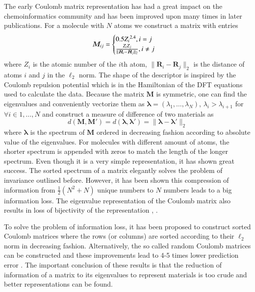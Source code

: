 \documentclass[11pt,oneside,czech,american]{book} %
\theoremstyle{plain}
\theoremstyle{definition}
\begin{document}
The early Coulomb matrix representation \parencite{rupp12} has had a great impact on the chemoinformatics community and has been improved upon many times in later publications. For a molecule with $N$ atoms we construct a matrix with entries
\begin{equation}
	\bm{M}_{ij} =
	\begin{cases}
		0.5 {Z_{i}}^{2.4},\space i = j \\
		\frac{Z_i Z_j}{\|\boldsymbol{R}_i - \boldsymbol{R}_j\|_2}, \space i \neq j \\
	\end{cases}	
	\label{coulomb}
\end{equation}
where $Z_i$ is the atomic number of the $i$th atom, $\|\boldsymbol{R}_i - \boldsymbol{R}_j\|_2$ is the distance of atoms $i$ and $j$ in the $\ell_{2}$ norm. The shape of the descriptor is inspired by the Coulomb repulsion potential which is in the Hamiltonian of the DFT equations used to calculate the data. Because the matrix $\bm{M}$ is symmetric, one can find the eigenvalues and conveniently vectorize them as $\boldsymbol{\lambda} = (\lambda_1, \dots, \lambda_N)$, $\lambda_{i}>\lambda_{i+1}$ for $\forall i \in {1,\dots,N}$ and construct a measure of difference of two materials as 
\begin{equation}
	d(\bm{M}, \bm{M'}) = d(\boldsymbol{\lambda}, \boldsymbol{\lambda}') = \| \boldsymbol{\lambda} - \boldsymbol{\lambda}' \|_2
\end{equation}
where $\boldsymbol{\lambda}$ is the spectrum of $\bm{M}$ ordered in decreasing fashion according to absolute value of the eigenvalues. For molecules with different amount of atoms, the shorter spectrum is appended with zeros to match the length of the longer spectrum. Even though it is a very simple representation, it has shown great success. The sorted spectrum of a matrix elegantly solves the problem of invariance outlined before. However, it has been shown \parencite{hansen13} this compression of information from $\frac{1}{2}(N^2 + N)$ unique numbers to $N$ numbers leads to a big information loss. The eigenvalue representation of the Coulomb matrix also results in loss of bijectivity of the representation \parencite{rup12answer}, \parencite{moussa12question}. 

To solve the problem of information loss, it has been proposed to construct sorted Coulomb matrices where the rows (or columns) are sorted according to their $\ell_{2}$ norm in decreasing fashion. Alternatively, the so called random Coulomb matrices can be constructed and these improvements lead to 4-5 times lower prediction error \parencite{hansen13}. The important conclusion of these results is that the reduction of information of a matrix to its eigenvalues to represent materials is too crude and better representations can be found.
\end{document}
